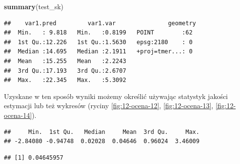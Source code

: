 \documentclass[
  paper=6in:9in,pagesize=pdftex,headinclude=on,footinclude=on,10pt]{scrbook}
\newenvironment{Shaded}{\begin{snugshade}}{\end{snugshade}}
\newcommand{\DecValTok}[1]{\textcolor[rgb]{0.00,0.00,0.81}{#1}}
\newcommand{\FunctionTok}[1]{\textcolor[rgb]{0.13,0.29,0.53}{\textbf{#1}}}
\newcommand{\NormalTok}[1]{#1}
\newcommand{\OtherTok}[1]{\textcolor[rgb]{0.56,0.35,0.01}{#1}}
\newcommand{\SpecialCharTok}[1]{\textcolor[rgb]{0.81,0.36,0.00}{\textbf{#1}}}
\begin{document}
\begin{Shaded}
\begin{Highlighting}[]
\FunctionTok{summary}\NormalTok{(test\_sk)}
\end{Highlighting}
\end{Shaded}

\begin{verbatim}
##    var1.pred         var1.var               geometry 
##  Min.   : 9.818   Min.   :0.8199   POINT        :62  
##  1st Qu.:12.226   1st Qu.:1.5630   epsg:2180    : 0  
##  Median :14.695   Median :2.1911   +proj=tmer...: 0  
##  Mean   :15.255   Mean   :2.2243                     
##  3rd Qu.:17.193   3rd Qu.:2.6707                     
##  Max.   :22.345   Max.   :5.3092
\end{verbatim}

Uzyskane w ten sposób wyniki możemy określić używając statystyk jakości estymacji lub też wykresów (ryciny \ref{fig:12-ocena-12}, \ref{fig:12-ocena-13}, \ref{fig:12-ocena-14}).

\begin{Shaded}
\end{Shaded}

\begin{verbatim}
##     Min.  1st Qu.   Median     Mean  3rd Qu.     Max. 
## -2.84080 -0.94748  0.02028  0.04646  0.96024  3.46009
\end{verbatim}

\begin{Shaded}
\end{Shaded}

\begin{verbatim}
## [1] 0.04645957
\end{verbatim}

\begin{Shaded}
\end{Shaded}
\end{document}
